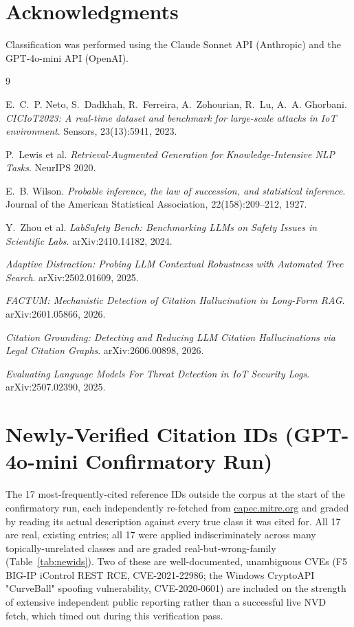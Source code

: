 \documentclass[11pt]{article}
\begin{document}
\section*{Acknowledgments}

Classification was performed using the Claude Sonnet API (Anthropic) and the GPT-4o-mini API
(OpenAI).

\begin{thebibliography}{9}

E.~C.~P. Neto, S.~Dadkhah, R.~Ferreira, A.~Zohourian, R.~Lu, A.~A. Ghorbani.
\textit{CICIoT2023: A real-time dataset and benchmark for large-scale attacks in IoT
environment}. Sensors, 23(13):5941, 2023.

P.~Lewis et al.
\textit{Retrieval-Augmented Generation for Knowledge-Intensive NLP Tasks}.
NeurIPS 2020.

E.~B. Wilson.
\textit{Probable inference, the law of succession, and statistical inference}.
Journal of the American Statistical Association, 22(158):209--212, 1927.

Y.~Zhou et al.
\textit{LabSafety Bench: Benchmarking LLMs on Safety Issues in Scientific Labs}.
arXiv:2410.14182, 2024.

\textit{Adaptive Distraction: Probing LLM Contextual Robustness with Automated Tree Search}.
arXiv:2502.01609, 2025.

\textit{FACTUM: Mechanistic Detection of Citation Hallucination in Long-Form RAG}.
arXiv:2601.05866, 2026.

\textit{Citation Grounding: Detecting and Reducing LLM Citation Hallucinations via Legal
Citation Graphs}. arXiv:2606.00898, 2026.

\textit{Evaluating Language Models For Threat Detection in IoT Security Logs}.
arXiv:2507.02390, 2025.

\end{thebibliography}

\appendix
\section{Newly-Verified Citation IDs (GPT-4o-mini Confirmatory Run)}
\label{sec:appendix}

The 17 most-frequently-cited reference IDs outside the corpus at the start of the confirmatory
run, each independently re-fetched from \url{capec.mitre.org} and graded by reading its actual
description against every true class it was cited for. All 17 are real, existing entries; all 17
were applied indiscriminately across many topically-unrelated classes and are graded
real-but-wrong-family (Table~\ref{tab:newids}). Two of these are well-documented, unambiguous CVEs
(F5 BIG-IP iControl REST RCE, CVE-2021-22986; the Windows CryptoAPI "CurveBall" spoofing
vulnerability, CVE-2020-0601) are included on the strength of extensive independent public
reporting rather than a successful live NVD fetch, which timed out during this verification pass.
\end{document}
